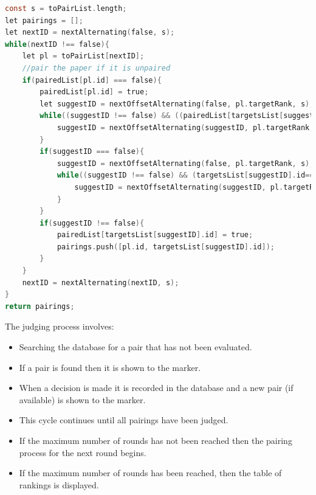 \documentclass{l4proj}
\begin{document}
\begin{lstlisting}[language=C, caption=JavaScript code for pairing up submissions using pairing info, captionpos=b]
 const s = toPairList.length;
let pairings = [];
let nextID = nextAlternating(false, s);
while(nextID !== false){
    let pl = toPairList[nextID];
    //pair the paper if it is unpaired
    if(pairedList[pl.id] === false){
        pairedList[pl.id] = true;
        let suggestID = nextOffsetAlternating(false, pl.targetRank, s);
        while((suggestID !== false) && ((pairedList[targetsList[suggestID].id]) || (targetsList[suggestID].id==pl.id) || (this.papers[pl.id].countComparisons(targetsList[suggestID].id)))){
            suggestID = nextOffsetAlternating(suggestID, pl.targetRank, s);
        }
        if(suggestID === false){
            suggestID = nextOffsetAlternating(false, pl.targetRank, s);
            while((suggestID !== false) && (targetsList[suggestID].id==pl.id)){
                suggestID = nextOffsetAlternating(suggestID, pl.targetRank, s);
            }
        }
        if(suggestID !== false){
            pairedList[targetsList[suggestID].id] = true;
            pairings.push([pl.id, targetsList[suggestID].id]);
        }
    }
    nextID = nextAlternating(nextID, s);
}
return pairings;
\end{lstlisting}

The judging process involves:
\begin{itemize}
  \item Searching the database for a pair that has not been evaluated.
  \item If a pair is found then it is shown to the marker.
  \item When a decision is made it is recorded in the database and a new pair (if available) is shown to the marker.
  \item This cycle continues until all pairings have been judged.
  \item If the maximum number of rounds has not been reached then the pairing process for the next round begins.
  \item If the maximum number of rounds has been reached, then the table of rankings is displayed.
\end{itemize}
\end{document}
